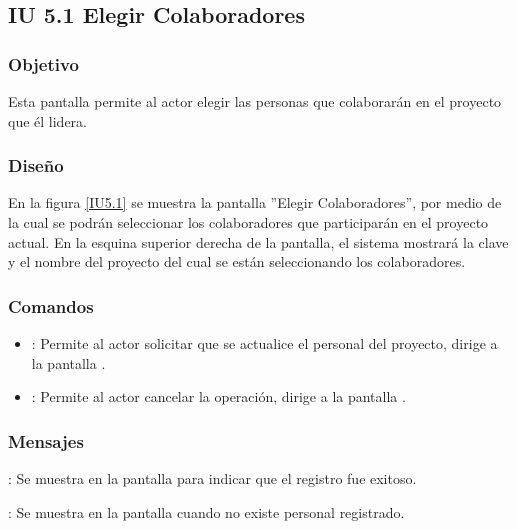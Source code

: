 \subsection{IU 5.1 Elegir Colaboradores}

\subsubsection{Objetivo}
	Esta pantalla permite al actor elegir las personas que colaborarán en el proyecto que él lidera.
\subsubsection{Diseño}
	En la figura \ref{IU5.1} se muestra la pantalla ''Elegir Colaboradores'', por medio de la cual se podrán seleccionar los colaboradores que participarán en el proyecto actual. En la esquina superior derecha de la pantalla, el sistema mostrará la clave y el nombre del proyecto del cual se están seleccionando los colaboradores.

\label{IU5.1}
\subsubsection{Comandos}
\begin{itemize}
	\item {}: Permite al actor solicitar que se actualice el personal del proyecto, dirige a la pantalla .
	\item {}: Permite al actor cancelar la operación, dirige a la pantalla .
\end{itemize}

\subsubsection{Mensajes}

\begin{Citemize}
	\item {}: Se muestra en la pantalla  para indicar que el registro fue exitoso.
	\item {}: Se muestra en la pantalla  cuando no existe personal registrado.
\end{Citemize}
